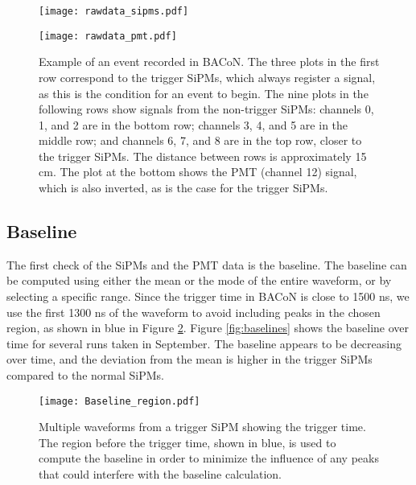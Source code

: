 \documentclass[11pt,a4paper,english,oneside, pdf]{article}
\begin{document}
		\begin{figure}[!h]
			\begin{center}
				\texttt{[image: rawdata\_sipms.pdf]}
				
				\vspace{0.6cm}
				\texttt{[image: rawdata\_pmt.pdf]}
				\caption{Example of an event recorded in BACoN. The three plots in the first row correspond to the trigger SiPMs, which always register a signal, as this is the condition for an event to begin. The nine plots in the following rows show signals from the non-trigger SiPMs: channels 0, 1, and 2 are in the bottom row; channels 3, 4, and 5 are in the middle row; and channels 6, 7, and 8 are in the top row, closer to the trigger SiPMs. The distance between rows is approximately 15 cm. The plot at the bottom shows the PMT (channel 12) signal, which is also inverted, as is the case for the trigger SiPMs.}
				\label{fig:rawdata}
			\end{center}
		\end{figure}
		
	
	\subsection{Baseline}
	\label{baseline_sec}
	
	
	The first check of the SiPMs and the PMT data is the baseline. The baseline can be computed using either the mean or the mode of the entire waveform, or by selecting a specific range. Since the trigger time in BACoN is close to 1500 ns, we use the first 1300 ns of the waveform to avoid including peaks in the chosen region, as shown in blue in Figure \ref{fig:baseline_region}. Figure \ref{fig:baselines} shows the baseline over time for several runs taken in September. The baseline appears to be decreasing over time, and the deviation from the mean is higher in the trigger SiPMs compared to the normal SiPMs.
	
	\begin{figure}[!h]
		\begin{center}
			\texttt{[image: Baseline\_region.pdf]}
			\caption{Multiple waveforms from a trigger SiPM showing the trigger time. The region before the trigger time, shown in blue, is used to compute the baseline in order to minimize the influence of any peaks that could interfere with the baseline calculation.}
			\label{fig:baseline_region}
		\end{center}
	\end{figure}
	
\end{document}
